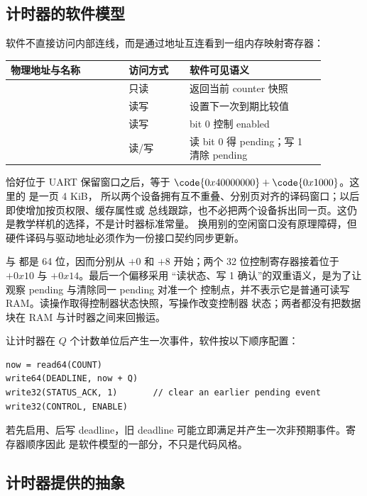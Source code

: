 \subsection{计时器的软件模型}

软件不直接访问内部连线，而是通过地址互连看到一组内存映射寄存器：

\begin{longtable}{|L{0.33\linewidth}|L{0.17\linewidth}|L{0.38\linewidth}|}
\hline
{}
物理地址与名称 & 访问方式 & 软件可见语义 \\ \hline
{} & 只读 & 返回当前 counter 快照 \\ \hline
{} & 读写 & 设置下一次到期比较值 \\ \hline
{} & 读写 & bit 0 控制 enabled \\ \hline
{} & 读/写 & 读 bit 0 得 pending；写 1 清除 pending \\ \hline
\end{longtable}

 恰好位于 UART 保留窗口之后，等于
\(\code{0x40000000}+\code{0x1000}\)。这里的  是一页 4 KiB，
所以两个设备拥有互不重叠、分别页对齐的译码窗口；以后即使增加按页权限、缓存属性或
总线跟踪，也不必把两个设备拆出同一页。这仍是教学样机的选择，不是计时器标准常量。
换用别的空闲窗口没有原理障碍，但硬件译码与驱动地址必须作为一份接口契约同步更新。

 与  都是 64 位，因而分别从 \(+0\) 和 \(+8\)
开始；两个 32 位控制寄存器接着位于 \(+0x10\) 与 \(+0x14\)。最后一个偏移采用
“读状态、写 1 确认”的双重语义，是为了让观察 pending 与清除同一 pending 对准一个
控制点，并不表示它是普通可读写 RAM。读操作取得控制器状态快照，写操作改变控制器
状态；两者都没有把数据块在 RAM 与计时器之间来回搬运。

让计时器在 \(Q\) 个计数单位后产生一次事件，软件按以下顺序配置：

\begin{lstlisting}
now = read64(COUNT)
write64(DEADLINE, now + Q)
write32(STATUS_ACK, 1)       // clear an earlier pending event
write32(CONTROL, ENABLE)
\end{lstlisting}

若先启用、后写 deadline，旧 deadline 可能立即满足并产生一次非预期事件。寄存器顺序因此
是软件模型的一部分，不只是代码风格。

\subsection{计时器提供的抽象}

